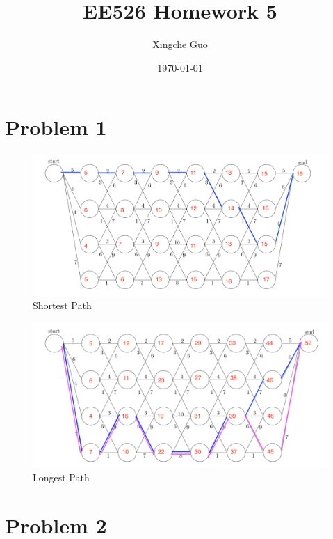 \documentclass[12pt]{article}
\title{EE526 Homework 5}
\author{Xingche Guo}
\date{\today}
\begin{document}
\maketitle

\section*{Problem 1}

\begin{figure}[h] 
\includegraphics[width=1.0\textwidth]{prob1_1}
\caption{Shortest Path}
\end{figure}


\begin{figure}[h] 
\includegraphics[width=1.0\textwidth]{prob1_2}
\caption{Longest Path}
\end{figure}





\section*{Problem 2}
\end{document}
